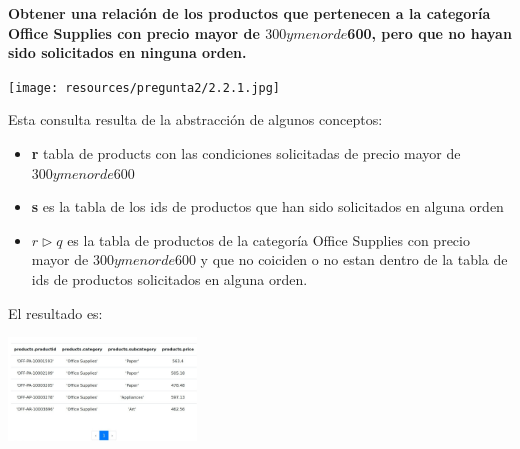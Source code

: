 \textbf{Obtener una relación de los productos que pertenecen a la categoría Office Supplies con precio mayor de $300 y menor de $600, pero que no hayan sido solicitados en ninguna orden.} \vspace{.3cm}

\begin{center}
    \texttt{[image: resources/pregunta2/2.2.1.jpg]}
\end{center}

Esta consulta resulta de la abstracción de algunos conceptos:
\begin{itemize}
    \item \textbf{r} tabla de products con las condiciones solicitadas de precio mayor de $300 y menor de $600
    \item  \textbf{s} es la tabla de los ids de productos que han sido solicitados en alguna orden
    \item  \textbf{$r \vartriangleright q$} es la tabla de productos de la categoría Office Supplies con precio mayor de $300 y menor de $600 y que no coiciden o no estan dentro de la tabla de ids de productos solicitados en alguna orden.
\end{itemize}

El resultado es:

\begin{center}
    \includegraphics[width=5cm]{resources/pregunta2/2.2.2}
\end{center}

